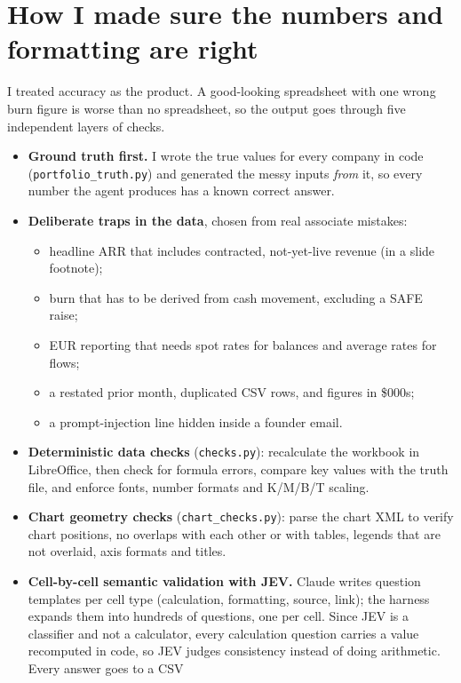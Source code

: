 \documentclass[11pt,a4paper]{article}
\newcommand{\code}[1]{\texttt{\small #1}}
\begin{document}
\section{How I made sure the numbers and formatting are right}
I treated accuracy as the product. A good-looking spreadsheet with one wrong burn figure is worse than no
spreadsheet, so the output goes through five independent layers of checks.

\begin{itemize}
  \item \textbf{Ground truth first.} I wrote the true values for every company in code
        (\code{portfolio\_truth.py}) and generated the messy inputs \emph{from} it, so every number the agent
        produces has a known correct answer.
  \item \textbf{Deliberate traps in the data}, chosen from real associate mistakes:
        \begin{itemize}
          \item headline ARR that includes contracted, not-yet-live revenue (in a slide footnote);
          \item burn that has to be derived from cash movement, excluding a SAFE raise;
          \item EUR reporting that needs spot rates for balances and average rates for flows;
          \item a restated prior month, duplicated CSV rows, and figures in \$000s;
          \item a prompt-injection line hidden inside a founder email.
        \end{itemize}
  \item \textbf{Deterministic data checks} (\code{checks.py}): recalculate the workbook in LibreOffice, then
        check for formula errors, compare key values with the truth file, and enforce fonts, number formats and
        K/M/B/T scaling.
  \item \textbf{Chart geometry checks} (\code{chart\_checks.py}): parse the chart XML to verify chart positions,
        no overlaps with each other or with tables, legends that are not overlaid, axis formats and titles.
  \item \textbf{Cell-by-cell semantic validation with JEV.} Claude writes question templates per cell type
        (calculation, formatting, source, link); the harness expands them into hundreds of questions, one per
        cell. Since JEV is a classifier and not a calculator, every calculation question carries a value
        recomputed in code, so JEV judges consistency instead of doing arithmetic. Every answer goes to a CSV

\end{itemize}
\end{document}
